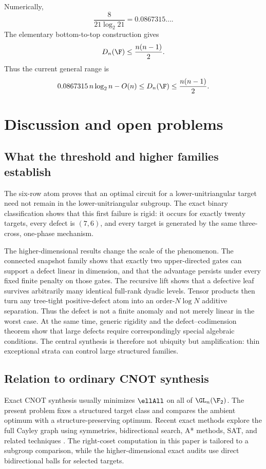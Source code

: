 Numerically,
\[
\frac{8}{21\log_2 21}
=0.0867315\ldots.
\]
The elementary bottom-to-top construction gives
\[
D_n(\F)\le\frac{n(n-1)}2.
\]
Thus the current general range is
\begin{equation}\label{eq:defect-range}
0.0867315\,n\log_2n-O(n)
\le
D_n(\F)
\le
\frac{n(n-1)}2.
\end{equation}

\section{Discussion and open problems}\label{sec:discussion}

\subsection{What the threshold and higher families establish}

The six-row atom proves that an optimal circuit for a lower-unitriangular target need not remain in the lower-unitriangular subgroup.  The exact binary classification shows that this first failure is rigid: it occurs for exactly twenty targets, every defect is $(7,6)$, and every target is generated by the same three-cross, one-phase mechanism.

The higher-dimensional results change the scale of the phenomenon.  The connected snapshot family shows that exactly two upper-directed gates can support a defect linear in dimension, and that the advantage persists under every fixed finite penalty on those gates.  The recursive lift shows that a defective leaf survives arbitrarily many identical full-rank dyadic levels.  Tensor products then turn any tree-tight positive-defect atom into an order-$N\log N$ additive separation.  Thus the defect is not a finite anomaly and not merely linear in the worst case.  At the same time, generic rigidity and the defect--codimension theorem show that large defects require correspondingly special algebraic conditions.  The central synthesis is therefore not ubiquity but amplification: thin exceptional strata can control large structured families.

\subsection{Relation to ordinary CNOT synthesis}

Exact CNOT synthesis usually minimizes $\ellAll$ on all of $\GL_n(\F_2)$.  The present problem fixes a structured target class and compares the ambient optimum with a structure-preserving optimum.  Recent exact methods explore the full Cayley graph using symmetries, bidirectional search, A* methods, SAT, and related techniques \cite{ChristensenEtAl2025,WebsterEtAl2025,ShaikVanDePol2025}.  The right-coset computation in this paper is tailored to a subgroup comparison, while the higher-dimensional exact audits use direct bidirectional balls for selected targets.

